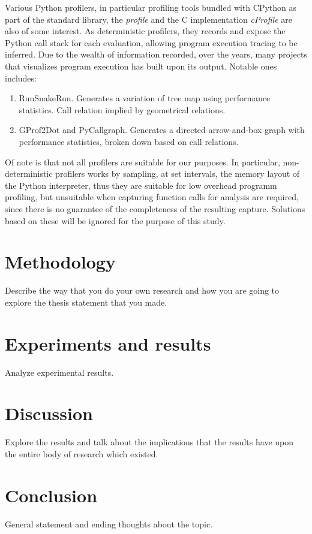 \documentclass[conference]{IEEEtran}
\begin{document}
Various Python profilers, in particular profiling tools bundled with CPython as part of the standard library, the \textit{profile} and the C implementation \textit{cProfile} are also of some interest. As deterministic profilers, they records and expose the Python call stack for each evaluation, allowing program execution tracing to be inferred. Due to the wealth of information recorded, over the years, many projects that visualizes program execution has built upon its output. Notable ones includes: \par
\begin{enumerate}
    \item RunSnakeRun. Generates a variation of tree map using performance statistics. Call relation implied by geometrical relations.
    \item GProf2Dot and PyCallgraph. Generates a directed arrow-and-box graph with performance statistics, broken down based on call relations.
\end{enumerate}
Of note is that not all profilers are suitable for our purposes. In particular, non-deterministic profilers works by sampling, at set intervals, the memory layout of the Python interpreter, thus they are suitable for low overhead programm profiling, but unsuitable when capturing function calls for analysis are required, since there is no guarantee of the completeness of the resulting capture. Solutions based on these will be ignored for the purpose of this study.

\section{Methodology}
Describe the way that you do your own research and how you are going to explore the thesis statement that you made. 

\section{Experiments and results}


Analyze experimental results. 
\section{Discussion}
Explore the results and talk about the implications that the results have upon the entire body of research which existed. 

\section{Conclusion}
General statement and ending thoughts about the topic. 
\end{document}
